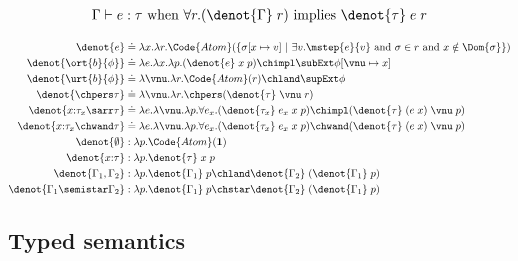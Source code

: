 \begin{theorem}
  \begin{align*}
    \Gamma \vdash e : \tau \text{ when } \forall r. (\denot{\Gamma}\;r) \text{ implies } \denot{\tau}\;e\;r
  \end{align*}\noindent
  \end{theorem}

  \begin{align*}
    \denot{e} &\doteq \lambda x.\lambda r. \Code{Atom}(\{ \sigma[x\mapsto v] ~|~ \exists v. \mstep{e}{v} \text{ and } \sigma \in r \text{ and } x \notin \Dom{\sigma} \})
    \\\denot{\ort{b}{\phi}} &\doteq \lambda e.\lambda x.\lambda p. (\denot{e}\;x\;p) \chimpl \subExt\phi[\vnu \mapsto x]
    \\\denot{\urt{b}{\phi}} &\doteq \lambda \vnu.\lambda r.\Code{Atom}(r) \chland \supExt\phi
    \\\denot{\chpers \tau} &\doteq \lambda \vnu.\lambda r. \chpers (\denot{\tau}\;\vnu\;r)
    \\\denot{x{:}\tau_x \sarr \tau} &\doteq \lambda e.\lambda \vnu.\lambda p.\forall e_x. (\denot{\tau_x}\;e_x\;x\;p) \chimpl (\denot{\tau}\;(e\;x)\;\vnu\;p) 
    \\\denot{x{:}\tau_x \chwand \tau} &\doteq \lambda e.\lambda \vnu.\lambda p.\forall e_x. (\denot{\tau_x}\;e_x\;x\;p) \chwand (\denot{\tau}\;(e\;x)\;\vnu\;p)
    \\\denot{\emptyset} &: \lambda p.\Code{Atom}(\mathbf{1})
    \\\denot{x{:}\tau} &: \lambda p. \denot{\tau}\;x\;p
    \\\denot{\Gamma_1, \Gamma_2} &: \lambda p.\denot{\Gamma_1}\;p \chland \denot{\Gamma_2}\;(\denot{\Gamma_1}\;p) 
    \\\denot{\Gamma_1 \semistar \Gamma_2} &: \lambda p.\denot{\Gamma_1}\;p \chstar \denot{\Gamma_2}\;(\denot{\Gamma_1}\;p) 
  \end{align*}\noindent
  

\subsection{Typed semantics}

